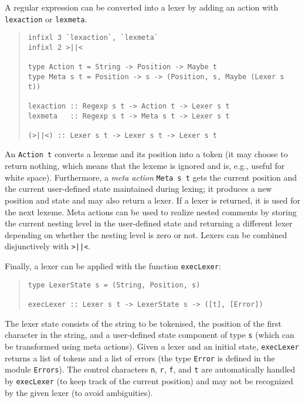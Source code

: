 \documentclass{report}
\newcommand{\code}[1]{\texttt{#1}}
\begin{document}
A regular expression can be converted into a lexer by adding an action with
\code{lexaction} or \code{lexmeta}.
%
\begin{quote}
\begin{verbatim}
infixl 3 `lexaction`, `lexmeta`
infixl 2 >||<

type Action t = String -> Position -> Maybe t
type Meta s t = Position -> s -> (Position, s, Maybe (Lexer s t))

lexaction :: Regexp s t -> Action t -> Lexer s t
lexmeta   :: Regexp s t -> Meta s t -> Lexer s t

(>||<) :: Lexer s t -> Lexer s t -> Lexer s t
\end{verbatim}
\end{quote}
%
An \code{Action t} converts a lexeme and its position into a token (it may
choose to return nothing, which means that the lexeme is ignored and is, e.g.,
useful for white space).  Furthermore, a \emph{meta action} \code{Meta s t}
gets the current position and the current user-defined state maintained during 
lexing; it produces a new position and state and may also return a lexer.  If
a lexer is returned, it is used for the next lexeme.  Meta actions can be used 
to realize nested comments by storing the current nesting level in the
user-defined state and returning a different lexer depending on whether the
nesting level is zero or not.  Lexers can be combined disjunctively with
\code{>||<}. 

Finally, a lexer can be applied with the function \code{execLexer}:
%
\begin{quote}
\begin{verbatim}
type LexerState s = (String, Position, s)

execLexer :: Lexer s t -> LexerState s -> ([t], [Error])
\end{verbatim}
\end{quote}
%
The lexer state consists of the string to be tokenised, the position of the
first character in the string, and a user-defined state component of type
\code{s} (which can be transformed using meta actions).  Given a lexer and an
initial state, \code{execLexer} returns a list of tokens and a list of errors
(the type \code{Error} is defined in the module \code{Errors}).  The control
characters \code{\backslashchar n}, \code{\backslashchar r},
\code{\backslashchar f}, and \code{\backslashchar t} are automatically handled 
by \code{execLexer} (to keep track of the current position) and may not be
recognized by the given lexer (to avoid ambiguities).
\end{document}
